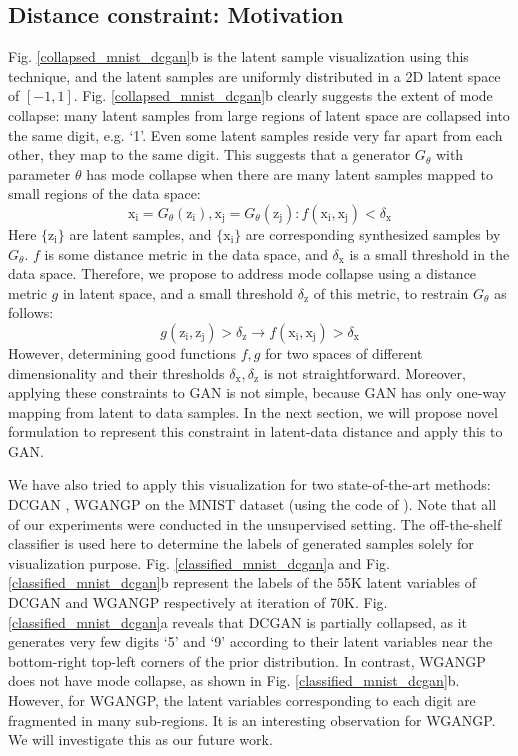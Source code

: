 \documentclass[runningheads]{llncs}
\newcommand*{\eg}{e.g. }
\begin{document}
\subsection{Distance constraint: Motivation}
Fig. \ref{collapsed_mnist_dcgan}b is the latent sample visualization using  this technique, and the latent samples are uniformly distributed in a 2D latent space of $[-1, 1]$. 
Fig. \ref{collapsed_mnist_dcgan}b clearly suggests the extent of mode collapse: many latent samples  from large regions of latent space are collapsed into the same digit, \eg `1'.
Even some latent samples reside  very far apart from each other, they map to the same digit.
This suggests that  a generator $G_{\theta}$ with parameter $\theta$ has mode collapse when there are many latent samples mapped to small regions of the data space:
\begin{equation}
\mathrm{x_i} = G_{\theta}(\mathrm{z_i}), \mathrm{x_j} = G_{\theta}(\mathrm{z_j}): f(\mathrm{x_i}, \mathrm{x_j}) < \delta_{\mathrm{x}}
\label{mode_collapse_eqn_1}
\end{equation}
Here $\{\mathrm{z_i}\}$ are latent samples, and $\{\mathrm{x_i}\}$ are corresponding synthesized samples by $G_{\theta}$. $f$ is some distance metric in the data space, and $\delta_{\mathrm{x}}$ is a small threshold in the data space. Therefore, we propose to address mode collapse using a distance metric $g$ in latent space, and a small threshold $\delta_{\mathrm{z}}$ of this metric, to restrain $G_{\theta}$ as follows:
\begin{equation}
g(\mathrm{z_i}, \mathrm{z_j}) > \delta_{\mathrm{z}} \to f(\mathrm{x_i}, \mathrm{x_j}) > \delta_{\mathrm{x}}
\label{mode_collapse_eqn_2}
\end{equation}
However, determining good functions $f, g$ for two spaces of different dimensionality and their thresholds $\delta_{\mathrm{x}}, \delta_{\mathrm{z}}$ is not straightforward. Moreover, applying these constraints to GAN is not simple, because GAN has only one-way mapping from latent to data samples. In the next section, we will propose novel formulation to represent this constraint in latent-data distance and apply this to GAN.

We have also tried to apply this visualization for two state-of-the-art methods: DCGAN \cite{radford-arxiv-2015}, WGANGP \cite{gulrajani-arxiv-2017} on the MNIST dataset (using the code of \cite{gulrajani-arxiv-2017}). Note that all of our experiments were conducted in the unsupervised setting. The off-the-shelf classifier is used here to determine the labels of generated samples solely for visualization purpose. Fig. \ref{classified_mnist_dcgan}a and Fig. \ref{classified_mnist_dcgan}b represent the labels of the 55K latent variables of DCGAN and WGANGP respectively at iteration of 70K.  Fig. \ref{classified_mnist_dcgan}a reveals that DCGAN is partially collapsed,  as it generates very few digits `5' and `9' according to their latent variables near the bottom-right top-left corners of the prior distribution. In contrast, WGANGP does not have mode collapse, as shown in Fig. \ref{classified_mnist_dcgan}b.  However, for WGANGP, the latent variables corresponding to  each digit are fragmented in many sub-regions. It is an interesting observation for WGANGP. We will investigate this as our future work.
\end{document}
